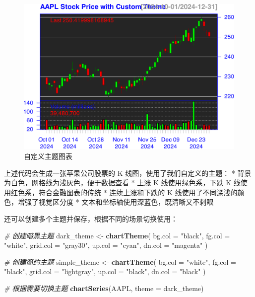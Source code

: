 \documentclass[]{ctexbook}
\newenvironment{Shaded}{\begin{snugshade}}{\end{snugshade}}
\newcommand{\AttributeTok}[1]{\textcolor[rgb]{0.13,0.29,0.53}{#1}}
\newcommand{\CommentTok}[1]{\textcolor[rgb]{0.56,0.35,0.01}{\textit{#1}}}
\newcommand{\FunctionTok}[1]{\textcolor[rgb]{0.13,0.29,0.53}{\textbf{#1}}}
\newcommand{\NormalTok}[1]{#1}
\newcommand{\OtherTok}[1]{\textcolor[rgb]{0.56,0.35,0.01}{#1}}
\newcommand{\StringTok}[1]{\textcolor[rgb]{0.31,0.60,0.02}{#1}}
\begin{document}
\begin{figure}
\includegraphics[width=0.9\linewidth]{quantmod_files/figure-latex/customTheme-1} \caption{自定义主题图表}\label{fig:customTheme}
\end{figure}

上述代码会生成一张苹果公司股票的 K 线图，使用了我们自定义的主题：
* 背景为白色，网格线为浅灰色，便于数据查看
* 上涨 K 线使用绿色系，下跌 K 线使用红色系，符合金融图表的传统
* 连续上涨和下跌的 K 线使用了不同深浅的颜色，增强了视觉区分度
* 文本和坐标轴使用深蓝色，既清晰又不刺眼

还可以创建多个主题并保存，根据不同的场景切换使用：

\begin{Shaded}
\begin{Highlighting}[]
\CommentTok{\# 创建暗黑主题}
\NormalTok{dark\_theme }\OtherTok{\textless{}{-}} \FunctionTok{chartTheme}\NormalTok{(}
  \AttributeTok{bg.col =} \StringTok{"black"}\NormalTok{,}
  \AttributeTok{fg.col =} \StringTok{"white"}\NormalTok{,}
  \AttributeTok{grid.col =} \StringTok{"gray30"}\NormalTok{,}
  \AttributeTok{up.col =} \StringTok{"cyan"}\NormalTok{,}
  \AttributeTok{dn.col =} \StringTok{"magenta"}
\NormalTok{)}

\CommentTok{\# 创建简约主题}
\NormalTok{simple\_theme }\OtherTok{\textless{}{-}} \FunctionTok{chartTheme}\NormalTok{(}
  \AttributeTok{bg.col =} \StringTok{"white"}\NormalTok{,}
  \AttributeTok{fg.col =} \StringTok{"black"}\NormalTok{,}
  \AttributeTok{grid.col =} \StringTok{"lightgray"}\NormalTok{,}
  \AttributeTok{up.col =} \StringTok{"black"}\NormalTok{,}
  \AttributeTok{dn.col =} \StringTok{"black"}
\NormalTok{)}

\CommentTok{\# 根据需要切换主题}
\FunctionTok{chartSeries}\NormalTok{(AAPL, }\AttributeTok{theme =}\NormalTok{ dark\_theme)}
\end{Highlighting}
\end{Shaded}
\end{document}

